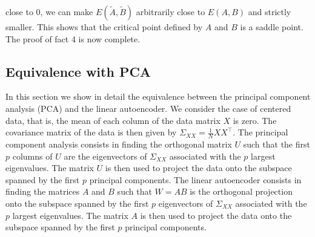 close to 0, we can make $E(\tilde{A},\tilde{B})$ arbitrarily close to $E(A,B)$ and strictly smaller. This shows that the critical point defined by $A$ and $B$ is a saddle point. The proof of fact 4 is now complete.



\subsection{Equivalence with PCA}
In this section we show in detail the equivalence between the principal component analysis (PCA) and the linear autoencoder. We consider the case of centered data, that is, the mean of each column of the data matrix $X$ is zero. The covariance matrix of the data is then given by $\Sigma_{XX} = \frac{1}{N}XX^\intercal$. The principal component analysis consists in finding the orthogonal matrix $U$ such that the first $p$ columns of $U$ are the eigenvectors of $\Sigma_{XX}$ associated with the $p$ largest eigenvalues. The matrix $U$ is then used to project the data onto the subspace spanned by the first $p$ principal components. The linear autoencoder consists in finding the matrices $A$ and $B$ such that $W = AB$ is the orthogonal projection onto the subspace spanned by the first $p$ eigenvectors of $\Sigma_{XX}$ associated with the $p$ largest eigenvalues. The matrix $A$ is then used to project the data onto the subspace spanned by the first $p$ principal components.


